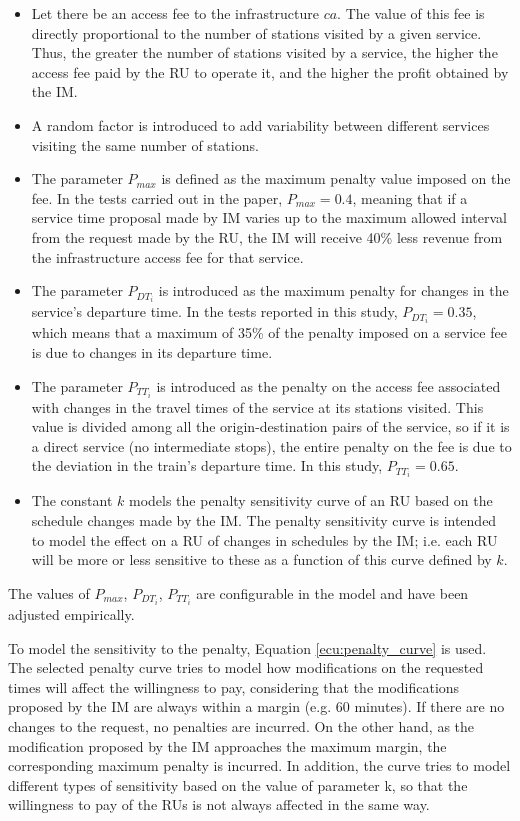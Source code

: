\documentclass[Afour,sagev,times]{sagej}
\begin{document}
\begin{itemize}
    \item Let there be an access fee to the infrastructure $ca$. The value of this fee is directly proportional to the number of stations visited by a given service. Thus, the greater the number of stations visited by a service, the higher the access fee paid by the \gls{RU} to operate it, and the higher the profit obtained by the \gls{IM}.
    \item A random factor is introduced to add variability between different services visiting the same number of stations.
    \item The parameter $P_{max}$ is defined as the maximum penalty value imposed on the fee. In the tests carried out in the paper, $P_{max} = 0.4$, meaning that if a service time proposal made by \gls{IM} varies up to the maximum allowed interval from the request made by the \gls{RU}, the \gls{IM} will receive 40\% less revenue from the infrastructure access fee for that service.
    \item The parameter $P_{DT_{i}}$ is introduced as the maximum penalty for changes in the service's departure time. In the tests reported in this study, $P_{DT_{i}} = 0.35$, which means that a maximum of 35\% of the penalty imposed on a service fee is due to changes in its departure time.
    \item The parameter $P_{TT_{i}}$ is introduced as the penalty on the access fee associated with changes in the travel times of the service at its stations visited. This value is divided among all the origin-destination pairs of the service, so if it is a direct service (no intermediate stops), the entire penalty on the fee is due to the deviation in the train's departure time. In this study, $P_{TT_{i}}=0.65$.
    \item The constant $ k $ models the penalty sensitivity curve of an \gls{RU} based on the schedule changes made by the \gls{IM}. The penalty sensitivity curve is intended to model the effect on a \gls{RU} of changes in schedules by the \gls{IM}; i.e. each \gls{RU} will be more or less sensitive to these as a function of this curve defined by $k$.
    \end{itemize}

The values of $P_{max}$, $P_{DT_{i}}$, $P_{TT_{i}}$ are configurable in the model and have been adjusted empirically.

To model the sensitivity to the penalty, Equation \ref{ecu:penalty_curve} is used. The selected penalty curve tries to model how modifications on the requested times will affect the willingness to pay, considering that the modifications proposed by the \gls{IM} are always within a margin (e.g. 60 minutes). If there are no changes to the request, no penalties are incurred. On the other hand, as the modification proposed by the \gls{IM} approaches the maximum margin, the corresponding maximum penalty is incurred. In addition, the curve tries to model different types of sensitivity based on the value of parameter k, so that the willingness to pay of the \glspl{RU} is not always affected in the same way.
\end{document}
